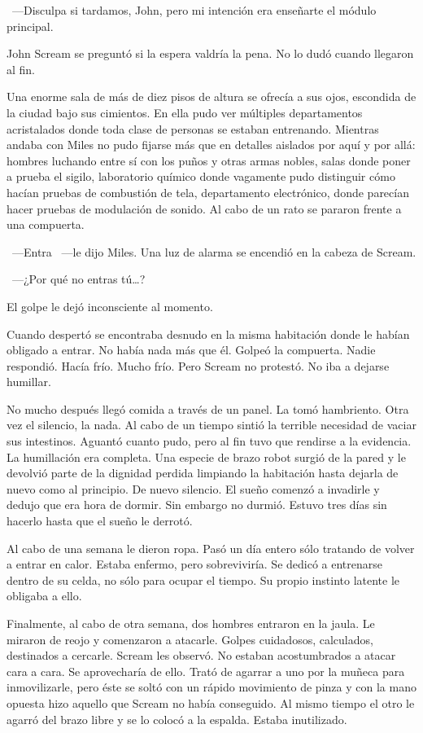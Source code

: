 ~---Disculpa si tardamos, John, pero mi intención era enseñarte el módulo principal.

John Scream se preguntó si la espera valdría la pena. No lo dudó cuando llegaron al fin.

Una enorme sala de más de diez pisos de altura se ofrecía a sus ojos, escondida de la ciudad bajo sus cimientos. En ella pudo ver múltiples departamentos acristalados donde toda clase de personas se estaban entrenando. Mientras andaba con Miles no pudo fijarse más que en detalles aislados por aquí y por allá: hombres luchando entre sí con los puños y otras armas nobles, salas donde poner a prueba el sigilo, laboratorio químico donde vagamente pudo distinguir cómo hacían pruebas de combustión de tela, departamento electrónico, donde parecían hacer pruebas de modulación de sonido. Al cabo de un rato se pararon frente a una compuerta.

~---Entra ~---le dijo Miles. Una luz de alarma se encendió en la cabeza de Scream.

~---¿Por qué no entras tú\dots?

El golpe le dejó inconsciente al momento.

Cuando despertó se encontraba desnudo en la misma habitación donde le habían obligado a entrar. No había nada más que él. Golpeó la compuerta. Nadie respondió. Hacía frío. Mucho frío. Pero Scream no protestó. No iba a dejarse humillar.

No mucho después llegó comida a través de un panel. La tomó hambriento. Otra vez el silencio, la nada. Al cabo de un tiempo sintió la terrible necesidad de vaciar sus intestinos. Aguantó cuanto pudo, pero al fin tuvo que rendirse a la evidencia. La humillación era completa. Una especie de brazo robot surgió de la pared y le devolvió parte de la dignidad perdida limpiando la habitación hasta dejarla de nuevo como al principio. De nuevo silencio. El sueño comenzó a invadirle y dedujo que era hora de dormir. Sin embargo no durmió. Estuvo tres días sin hacerlo hasta que el sueño le derrotó.

Al cabo de una semana le dieron ropa. Pasó un día entero sólo tratando de volver a entrar en calor. Estaba enfermo, pero sobreviviría. Se dedicó a entrenarse dentro de su celda, no sólo para ocupar el tiempo. Su propio instinto latente le obligaba a ello.

Finalmente, al cabo de otra semana, dos hombres entraron en la jaula. Le miraron de reojo y comenzaron a atacarle. Golpes cuidadosos, calculados, destinados a cercarle. Scream les observó. No estaban acostumbrados a atacar cara a cara. Se aprovecharía de ello. Trató de agarrar a uno por la muñeca para inmovilizarle, pero éste se soltó con un rápido movimiento de pinza y con la mano opuesta hizo aquello que Scream no había conseguido. Al mismo tiempo el otro le agarró del brazo libre y se lo colocó a la espalda. Estaba inutilizado.

